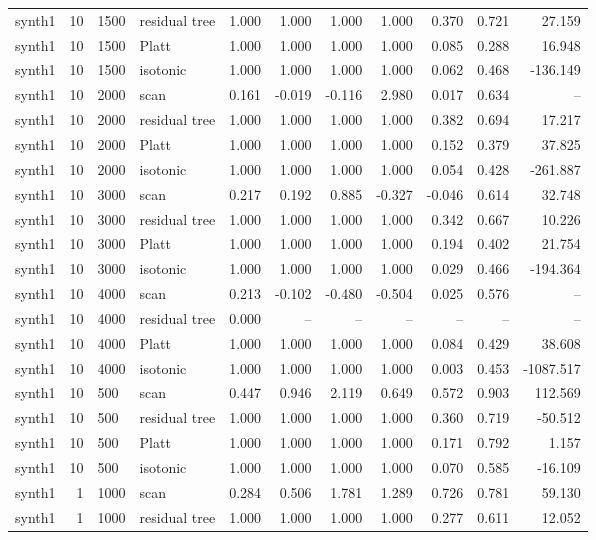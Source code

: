 \begin{tabular}{lrllrrrrrrr}
synth1 & 10 & 1500 & residual tree & 1.000 & 1.000 & 1.000 & 1.000 & 0.370 & 0.721 & 27.159 \\
synth1 & 10 & 1500 & Platt & 1.000 & 1.000 & 1.000 & 1.000 & 0.085 & 0.288 & 16.948 \\
synth1 & 10 & 1500 & isotonic & 1.000 & 1.000 & 1.000 & 1.000 & 0.062 & 0.468 & -136.149 \\
synth1 & 10 & 2000 & scan & 0.161 & -0.019 & -0.116 & 2.980 & 0.017 & 0.634 & -- \\
synth1 & 10 & 2000 & residual tree & 1.000 & 1.000 & 1.000 & 1.000 & 0.382 & 0.694 & 17.217 \\
synth1 & 10 & 2000 & Platt & 1.000 & 1.000 & 1.000 & 1.000 & 0.152 & 0.379 & 37.825 \\
synth1 & 10 & 2000 & isotonic & 1.000 & 1.000 & 1.000 & 1.000 & 0.054 & 0.428 & -261.887 \\
synth1 & 10 & 3000 & scan & 0.217 & 0.192 & 0.885 & -0.327 & -0.046 & 0.614 & 32.748 \\
synth1 & 10 & 3000 & residual tree & 1.000 & 1.000 & 1.000 & 1.000 & 0.342 & 0.667 & 10.226 \\
synth1 & 10 & 3000 & Platt & 1.000 & 1.000 & 1.000 & 1.000 & 0.194 & 0.402 & 21.754 \\
synth1 & 10 & 3000 & isotonic & 1.000 & 1.000 & 1.000 & 1.000 & 0.029 & 0.466 & -194.364 \\
synth1 & 10 & 4000 & scan & 0.213 & -0.102 & -0.480 & -0.504 & 0.025 & 0.576 & -- \\
synth1 & 10 & 4000 & residual tree & 0.000 & -- & -- & -- & -- & -- & -- \\
synth1 & 10 & 4000 & Platt & 1.000 & 1.000 & 1.000 & 1.000 & 0.084 & 0.429 & 38.608 \\
synth1 & 10 & 4000 & isotonic & 1.000 & 1.000 & 1.000 & 1.000 & 0.003 & 0.453 & -1087.517 \\
synth1 & 10 & 500 & scan & 0.447 & 0.946 & 2.119 & 0.649 & 0.572 & 0.903 & 112.569 \\
synth1 & 10 & 500 & residual tree & 1.000 & 1.000 & 1.000 & 1.000 & 0.360 & 0.719 & -50.512 \\
synth1 & 10 & 500 & Platt & 1.000 & 1.000 & 1.000 & 1.000 & 0.171 & 0.792 & 1.157 \\
synth1 & 10 & 500 & isotonic & 1.000 & 1.000 & 1.000 & 1.000 & 0.070 & 0.585 & -16.109 \\
synth1 & 1 & 1000 & scan & 0.284 & 0.506 & 1.781 & 1.289 & 0.726 & 0.781 & 59.130 \\
synth1 & 1 & 1000 & residual tree & 1.000 & 1.000 & 1.000 & 1.000 & 0.277 & 0.611 & 12.052 \\

\end{tabular}
